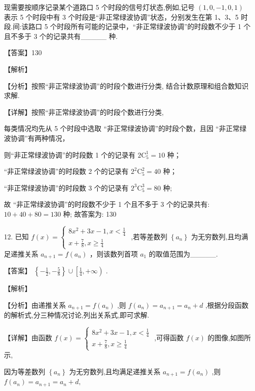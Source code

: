 \documentclass[10pt]{article}
\begin{document}
现需要按顺序记录某个道路口 5 个时段的信号灯状态,例如,记号 \(\left( {1,0, - 1,0,1}\right)\) 表示 5 个时段中有 3 个时段是“非正常绿波协调”状态，分别发生在第 1、3、5 时段.间:该路口 5 个时段所有可能的记录中，“非正常绿波协调”的时段数不少于 1 个且不多于 3 个的记录共有\_\_\_\_\_ 种.

【答案】130

【解析】

【分析】按照“非正常绿波协调”的时段个数进行分类, 结合计数原理和组合数知识求解.

【详解】按照“非正常绿波协调”的时段个数进行分类,

每类情况均先从 5 个时段中选取 “非正常绿波协调”的时段个数，且因 “非正常绿波协调”有两种情况，

则“非正常绿波协调”的时段数 1 个的记录有 \(2{\mathrm{C}}_{5}^{1} = {10}\) 种；

“非正常绿波协调”的时段数 2 个的记录有 \({2}^{2}{\mathrm{C}}_{5}^{2} = {40}\) 种；

“非正常绿波协调”的时段数 3 个的记录有 \({2}^{3}{\mathrm{C}}_{5}^{3} = {80}\) 种;

故 “非正常绿波协调”的时段数不少于 1 个且不多于 3 个的记录共有: \({10} + {40} + {80} = {130}\) 种; 故答案为: 130

12. 已知 \(f\left( x\right)  = \left\{  \begin{array}{l} 8{x}^{2} + {3x} - 1,x < \frac{1}{4} \\  x + \frac{7}{8},x \geq  \frac{1}{4} \end{array}\right.\) ,若等差数列 \(\left\{  {a}_{n}\right\}\) 为无穷数列,且均满足递推关系 \({a}_{n + 1} = f\left( {a}_{n}\right)\) ，则该数列首项 \({a}_{1}\) 的取值范围为\_\_\_\_\_.

【答案】 \(\left\{  {-\frac{1}{2}, - \frac{5}{8}}\right\}   \cup  \left\lbrack  {\frac{1}{4}, + \infty }\right)\) .

【解析】

【分析】由递推关系 \({a}_{n + 1} = f\left( {a}_{n}\right)\) ,则 \(f\left( {a}_{n}\right)  = {a}_{n + 1} = {a}_{n} + d\) ,根据分段函数的解析式,分三种情况讨论,列出关系式,即可求解.

【详解】由函数 \(f\left( x\right)  = \left\{  \begin{array}{l} 8{x}^{2} + {3x} - 1,x < \frac{1}{4} \\  x + \frac{7}{8},x \geq  \frac{1}{4} \end{array}\right.\) ,可得函数 \(f\left( x\right)\) 的图像,如图所示,

因为等差数列 \(\left\{  {a}_{n}\right\}\) 为无穷数列,且均满足递推关系 \({a}_{n + 1} = f\left( {a}_{n}\right)\) ,则 \(f\left( {a}_{n}\right)  = {a}_{n + 1} = {a}_{n} + d,\)
\end{document}
